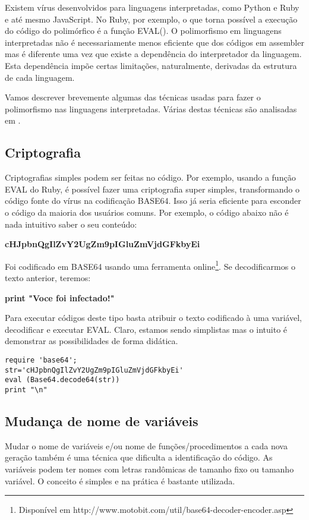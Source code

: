 Existem vírus desenvolvidos para linguagens interpretadas, como Python e Ruby e até mesmo JavaScript. No Ruby, por exemplo, o que torna possível a execução do código do polimórfico é a função EVAL(). O polimorfismo em linguagens interpretadas não é necessariamente menos eficiente que dos códigos em assembler mas é diferente uma vez que existe a dependência do interpretador da linguagem. Esta dependência impõe certas limitações, naturalmente, derivadas da estrutura de cada linguagem.

Vamos descrever brevemente algumas das técnicas usadas para fazer o polimorfismo nas linguagens interpretadas. Várias destas técnicas são analisadas em \cite{szappanos:1}.

\subsection{Criptografia}
Criptografias simples podem ser feitas no código. Por exemplo, usando a função EVAL do Ruby, é possível fazer uma criptografia super simples, transformando o código fonte do vírus na codificação BASE64. Isso já seria eficiente para esconder o código da maioria dos usuários comuns. Por exemplo, o código abaixo não é nada intuitivo saber o seu conteúdo:

\textbf{cHJpbnQgIlZvY2UgZm9pIGluZmVjdGFkbyEi}

Foi codificado em BASE64 usando uma ferramenta online\footnote{Disponível em http://www.motobit.com/util/base64-decoder-encoder.asp}. Se decodificarmos o texto anterior, teremos:

\textbf{print "Voce foi infectado!"}

Para executar códigos deste tipo basta atribuir o texto codificado à uma variável, decodificar e executar EVAL. Claro, estamos sendo simplistas mas o intuito é demonstrar as possibilidades de forma didática.

{{{
\renewcommand{\baselinestretch}{1.0}
\begin{verbatim}
require 'base64';
str='cHJpbnQgIlZvY2UgZm9pIGluZmVjdGFkbyEi'
eval (Base64.decode64(str))
print "\n"
\end{verbatim}
}}}

\subsection{Mudança de nome de variáveis}
Mudar o nome de variáveis e/ou nome de funções/procedimentos a cada nova geração também é uma técnica que dificulta a identificação do código. As variáveis podem ter nomes com letras randômicas de tamanho fixo ou tamanho variável. O conceito é simples e na prática é bastante utilizada.

